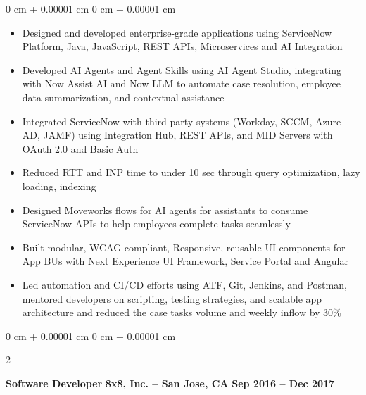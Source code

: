\documentclass[10pt, letterpaper]{article}
\newenvironment{highlights}{
    \begin{itemize}[
        topsep=0.10 cm,
        parsep=0.10 cm,
        partopsep=0pt,
        itemsep=0pt,
        leftmargin=0 cm + 10pt
    ]
}{
    \end{itemize}
} %
\newenvironment{onecolentry}{
    \begin{adjustwidth}{
        0 cm + 0.00001 cm
    }{
        0 cm + 0.00001 cm
    }
}{
    \end{adjustwidth}
} %
\newenvironment{twocolentry}[2][]{
    \onecolentry
    \def\secondColumn{#2}
    \setcolumnwidth{\fill, 4.5 cm}
    \begin{paracol}{2}
}{
    \switchcolumn \raggedleft \secondColumn
    \end{paracol}
    \endonecolentry
} %
\begin{document}
        \vspace{0.10 cm}
        \begin{onecolentry}
            \begin{highlights}
                \item Designed and developed enterprise-grade applications using ServiceNow Platform, Java, JavaScript,  REST APIs, Microservices and AI Integration
                \item Developed AI Agents and Agent Skills using AI Agent Studio, integrating with Now Assist AI and Now LLM to automate case resolution, employee data summarization, and contextual assistance
                \item Integrated ServiceNow with third-party systems (Workday, SCCM, Azure AD, JAMF) using Integration Hub, REST APIs, and MID Servers with OAuth 2.0 and Basic Auth
                \item Reduced RTT and INP time to under 10 sec through query optimization, lazy loading, indexing
                \item Designed Moveworks flows for AI agents for assistants to consume ServiceNow APIs to help employees complete tasks seamlessly 
                \item Built modular, WCAG-compliant, Responsive, reusable UI components for App BUs with Next Experience UI Framework, Service Portal and Angular
                \item Led automation and CI/CD efforts using ATF, Git, Jenkins, and Postman, mentored developers on scripting, testing strategies, and scalable app architecture and reduced the case tasks volume and weekly inflow by 30\%
            \end{highlights}
        \end{onecolentry}


        \vspace{0.2 cm}

        \begin{twocolentry}{
           \textbf {Sep 2016 – Dec 2017}
        }
            \textbf{Software Developer} \hspace{4.3cm}\textbf {8x8, Inc. -- San Jose, CA}\end{twocolentry}
\end{document}

